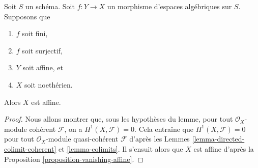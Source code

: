 \begin{lemma}
\label{lemma-image-affine-finite-morphism-affine-Noetherian}
Soit $S$ un schéma. Soit $f : Y \to X$ un morphisme d'espaces
algébriques sur $S$. Supposons que
\begin{enumerate}
\item $f$ soit fini,
\item $f$ soit surjectif,
\item $Y$ soit affine, et
\item $X$ soit noethérien.
\end{enumerate}
Alors $X$ est affine.
\end{lemma}

\begin{proof}
Nous allons montrer que, sous les hypothèses du lemme, pour tout
$\mathcal{O}_X$-module cohérent $\mathcal{F}$, on a $H^1(X, \mathcal{F}) = 0$.
Cela entraîne que $H^1(X, \mathcal{F}) = 0$ pour tout
$\mathcal{O}_X$-module quasi-cohérent $\mathcal{F}$ d'après les
Lemmes \ref{lemma-directed-colimit-coherent} et \ref{lemma-colimits}.
Il s'ensuit alors que $X$ est affine d'après la
Proposition \ref{proposition-vanishing-affine}.


\end{proof}
